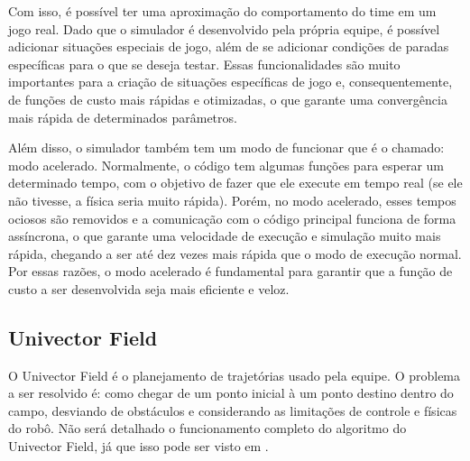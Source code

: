 \documentclass[10pt,fleqn,a4paper]{article}
\begin{document}
Com isso, é possível ter uma aproximação do comportamento do time em um jogo real. Dado que o simulador é desenvolvido pela própria equipe, é possível adicionar situações especiais de jogo, além de se adicionar condições de paradas específicas para o que se deseja testar. Essas funcionalidades são muito importantes para a criação de situações específicas de jogo e, consequentemente, de funções de custo mais rápidas e otimizadas, o que garante uma convergência mais rápida de determinados parâmetros.

Além disso, o simulador também tem um modo de funcionar que é o chamado: modo acelerado. Normalmente, o código tem algumas funções para esperar um determinado tempo, com o objetivo de fazer que ele execute em tempo real (se ele não tivesse, a física seria muito rápida). Porém, no modo acelerado, esses tempos ociosos são removidos e a comunicação com o código principal funciona de forma assíncrona, o que garante uma velocidade de execução e simulação muito mais rápida, chegando a ser até dez vezes mais rápida que o modo de execução normal. Por essas razões, o modo acelerado é fundamental para garantir que a função de custo a ser desenvolvida seja mais eficiente e veloz.

\subsection{Univector Field}

O Univector Field é o planejamento de trajetórias usado pela equipe. O problema a ser resolvido é: como chegar de um ponto inicial à um ponto destino dentro do campo, desviando de obstáculos e considerando as limitações de controle e físicas do robô. Não será detalhado o funcionamento completo do algoritmo do Univector Field, já que isso pode ser visto em \cite{univector}.
\end{document}
